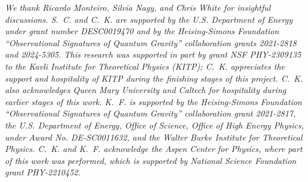 
\textit{We thank Ricardo Monteiro, Silvia Nagy, and Chris White for insightful discussions. S.~C. and C.~K. are
    supported by the U.S. Department of Energy under grant number DESC0019470 and by the Heising-Simons Foundation
    “Observational Signatures of Quantum Gravity” collaboration grants 2021-2818 and 2024-5305. This research was
    supported in part by grant NSF PHY-2309135 to the Kavli Institute for Theoretical Physics (KITP); C.~K.
    appreciates the support and hospitality of KITP during the finishing stages of this project.  C.~K. also
    acknowledges Queen Mary University and Caltech for hospitality during earlier stages of this work. K.~F. is
supported by the Heising-Simons Foundation ``Observational Signatures of Quantum Gravity'' collaboration grant
2021-2817, the U.S. Department of Energy, Office of Science, Office of High Energy Physics, under Award No.
DE-SC0011632, and the Walter Burke Institute for Theoretical Physics. C.~K. and K.~F. acknowledge the Aspen Center
for Physics, where part of this work was performed, which is supported by National Science Foundation grant
PHY-2210452. }

\nobibintoc
\printbibliography[heading=subbibliography]
